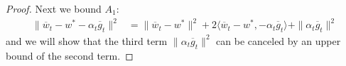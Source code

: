 \begin{proof}
	Next we bound $A_{1}$: 
	\begin{align*}
	\|\overline{w}_{t}-w^{\ast}-\alpha_{t}\overline{g}_{t}\|^{2} & =\|\overline{w}_{t}-w^{\ast}\|^{2}+2\langle\overline{w}_{t}-w^{\ast},-\alpha_{t}\overline{g}_{t}\rangle+\|\alpha_{t}\overline{g}_{t}\|^{2}
	\end{align*}
	and we will show that the third term $\|\alpha_{t}\overline{g}_{t}\|^{2}$
	can be canceled by an upper bound of the second term. %
	\begin{comment}
	The last term is straightforward to bound by the convexity of $\|\cdot\|^{2}$
	and $L$-smoothness of $F_{k}$,
	\begin{align*}
	\alpha_{t}^{2}\|\overline{g}_{t}\|^{2} & \leq\alpha_{t}^{2}\sum_{k=1}^{N}p_{k}\|\nabla F_{k}(w_{t}^{k})\|^{2}\leq2L\alpha_{t}^{2}\sum_{k=1}^{N}p_{k}(F_{k}(w_{t}^{k})-F_{k}^{\ast})
	\end{align*}
	or 
	\begin{align*}
	\alpha_{t}^{2}\|\overline{g}_{t}\|^{2} & \leq\alpha_{t}^{2}\sum_{k=1}^{N}p_{k}\|\nabla F_{k}(w_{t}^{k})\|^{2}\leq\alpha_{t}^{2}\sum_{k=1}^{N}p_{k}\mathbb{E}\|\nabla F_{k}(w_{t}^{k},\xi_{t}^{k})\|^{2}\leq\alpha_{t}^{2}G^{2}
	\end{align*}
	\end{comment}
	

\end{proof}

